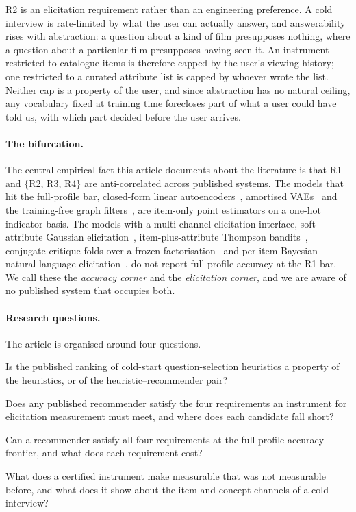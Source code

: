 \documentclass[acmsmall,review,anonymous]{acmart}
\begin{document}
R2 is an elicitation requirement rather than an engineering preference. A cold interview is rate-limited by what the user can actually answer, and answerability rises with abstraction: a question about a kind of film presupposes nothing, where a question about a particular film presupposes having seen it. An instrument restricted to catalogue items is therefore capped by the user's viewing history; one restricted to a curated attribute list is capped by whoever wrote the list. Neither cap is a property of the user, and since abstraction has no natural ceiling, any vocabulary fixed at training time forecloses part of what a user could have told us, with which part decided before the user arrives.

\paragraph{The bifurcation.} The central empirical fact this article documents about the literature is that R1 and $\{$R2, R3, R4$\}$ are anti-correlated across published systems. The models that hit the full-profile bar, closed-form linear autoencoders~\citep{steck2019ease,steck2020edlae}, amortised VAEs~\citep{liang2018variational,ren2020recvae} and the training-free graph filters~\citep{shen2021gfcf,choi2023bspm,park2024turbocf}, are item-only point estimators on a one-hot indicator basis. The models with a multi-channel elicitation interface, soft-attribute Gaussian elicitation~\citep{biyik2023soft}, item-plus-attribute Thompson bandits~\citep{li2021seamlessly}, conjugate critique folds over a frozen factorisation~\citep{toroghi2023bcie} and per-item Bayesian natural-language elicitation~\citep{austin2024bayesian}, do not report full-profile accuracy at the R1 bar. We call these the \emph{accuracy corner} and the \emph{elicitation corner}, and we are aware of no published system that occupies both.

\paragraph{Research questions.} The article is organised around four questions.
\begin{description}[leftmargin=3.2em,itemsep=2pt]
  \item[RQ1] Is the published ranking of cold-start question-selection heuristics a property of the heuristics, or of the heuristic--recommender pair?
  \item[RQ2] Does any published recommender satisfy the four requirements an instrument for elicitation measurement must meet, and where does each candidate fall short?
  \item[RQ3] Can a recommender satisfy all four requirements at the full-profile accuracy frontier, and what does each requirement cost?
  \item[RQ4] What does a certified instrument make measurable that was not measurable before, and what does it show about the item and concept channels of a cold interview?
\end{description}
\end{document}
